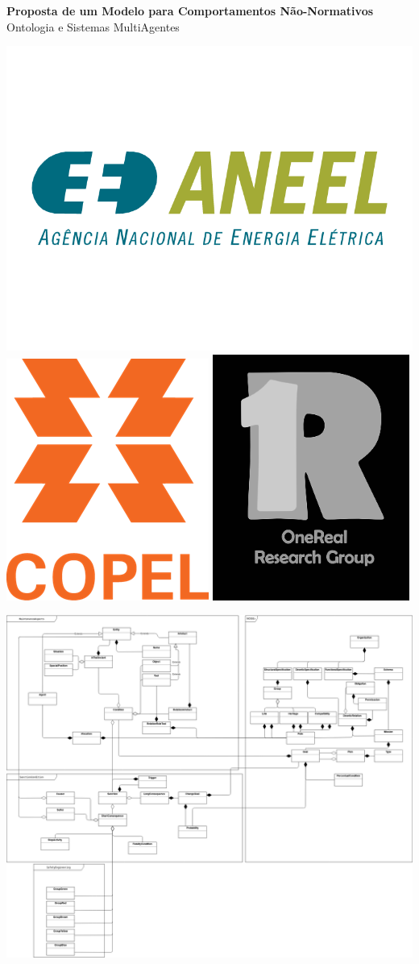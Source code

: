 \documentclass[a0,portrait]{a0poster}
\begin{document}


\begin{minipage}[b]{0.75\linewidth}
\veryHuge \color{NavyBlue} \textbf{Proposta de um Modelo para Comportamentos Não-Normativos} \color{Black}\\ %
\huge Ontologia e Sistemas MultiAgentes\\[0.4cm] %
\end{minipage}

\begin{center}
	\includegraphics[width=0.1\linewidth]{logoone}
	\includegraphics[width=0.05\linewidth]{logocopel}
	\includegraphics[width=0.05\linewidth]{onereal}
\end{center}
%
\vspace{1cm} %


\begin{center}\vspace{1cm} 
		\label{figUmlModelSimulation}
		\includegraphics[width=0.65\linewidth]{uml_model_simulation}
\end{center}\vspace{1cm} 
\end{document}
